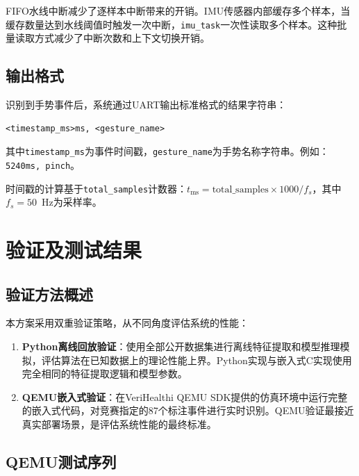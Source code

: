 \documentclass[lettersize,journal]{IEEEtran}
\begin{document}
FIFO水线中断减少了逐样本中断带来的开销。IMU传感器内部缓存多个样本，当缓存数量达到水线阈值时触发一次中断，\texttt{imu\_task}一次性读取多个样本。这种批量读取方式减少了中断次数和上下文切换开销。

\subsection{输出格式}

识别到手势事件后，系统通过UART输出标准格式的结果字符串：

\begin{verbatim}
<timestamp_ms>ms, <gesture_name>
\end{verbatim}

其中\texttt{timestamp\_ms}为事件时间戳，\texttt{gesture\_name}为手势名称字符串。例如：\texttt{5240ms, pinch}。

时间戳的计算基于\texttt{total\_samples}计数器：$t_\mathrm{ms} = \mathrm{total\_samples} \times 1000 / f_s$，其中$f_s = 50$~Hz为采样率。

\section{验证及测试结果}
\label{sec:results}

\subsection{验证方法概述}

本方案采用双重验证策略，从不同角度评估系统的性能：

\begin{enumerate}[leftmargin=*]
    \item \textbf{Python离线回放验证}：使用全部公开数据集进行离线特征提取和模型推理模拟，评估算法在已知数据上的理论性能上界。Python实现与嵌入式C实现使用完全相同的特征提取逻辑和模型参数。
    \item \textbf{QEMU嵌入式验证}：在VeriHealthi QEMU SDK提供的仿真环境中运行完整的嵌入式代码，对竞赛指定的87个标注事件进行实时识别。QEMU验证最接近真实部署场景，是评估系统性能的最终标准。
\end{enumerate}

\subsection{QEMU测试序列}
\end{document}
